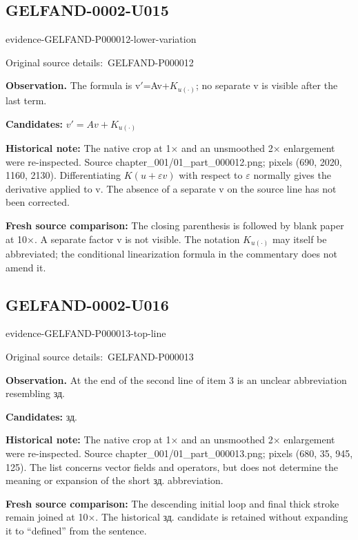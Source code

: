 \documentclass[11pt]{article}
\newcommand{\EvidenceBlock}[4]{%
 \par\smallskip\noindent\begin{minipage}{\linewidth}
 \begin{minipage}[t]{.47\linewidth}\vspace{0pt}\centering
 \csname evidence-#1-#2\endcsname\par
 {\scriptsize\SourceCropCaption\ #1}\par
 \end{minipage}\hfill
 \begin{minipage}[t]{.49\linewidth}\vspace{0pt}\raggedright
 {\small\color{orange!65!black}\textbf{#4} #3}\par
 \end{minipage}
 \end{minipage}\par\smallskip}
\newcommand{\SourceCropCaption}{Original source details:}\newcommand{\ReadingCaption}{Uncertain reading.}\newcommand{\IncompleteCaption}{Undeciphered passage.}\newcommand{\DiagramCaption}{Diagram and typed description.}
\begin{document}
\subsection*{GELFAND-0002-U015}
\EvidenceBlock{GELFAND-P000012}{lower-variation}{The formula is v\(\prime\)=Av+\(K_{u(\cdot)}\); no separate v is visible after the last term.}{Observation.}
\par\smallskip\noindent\textbf{Candidates: } \(v'=Av+K_{u(\cdot)}\)\par
\par\smallskip\noindent\textbf{Historical note: } The native crop at 1× and an unsmoothed 2× enlargement were re-inspected. Source chapter\_001/01\_part\_000012.png; pixels (690, 2020, 1160, 2130). Differentiating \(K(u+\varepsilon v)\) with respect to \(\varepsilon\) normally gives the derivative applied to v. The absence of a separate v on the source line has not been corrected.\par
\par\smallskip\noindent\textbf{Fresh source comparison: } The closing parenthesis is followed by blank paper at 10×. A separate factor v is not visible. The notation \(K_{u(\cdot)}\) may itself be abbreviated; the conditional linearization formula in the commentary does not amend it.\par

\subsection*{GELFAND-0002-U016}
\EvidenceBlock{GELFAND-P000013}{top-line}{At the end of the second line of item 3 is an unclear abbreviation resembling зд.}{Observation.}
\par\smallskip\noindent\textbf{Candidates: } зд.\par
\par\smallskip\noindent\textbf{Historical note: } The native crop at 1× and an unsmoothed 2× enlargement were re-inspected. Source chapter\_001/01\_part\_000013.png; pixels (680, 35, 945, 125). The list concerns vector fields and operators, but does not determine the meaning or expansion of the short зд. abbreviation.\par
\par\smallskip\noindent\textbf{Fresh source comparison: } The descending initial loop and final thick stroke remain joined at 10×. The historical зд. candidate is retained without expanding it to “defined” from the sentence.\par
\end{document}
